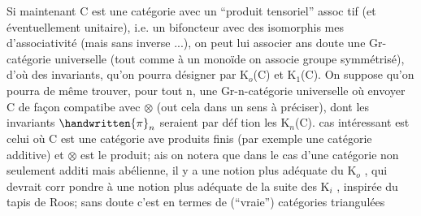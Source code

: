 Si maintenant C est une catégorie avec un ``produit tensoriel'' assoc
tif (et éventuellement unitaire), i.e. un bifoncteur avec des isomorphis%
mes d'associativité (mais sans inverse ...), on peut lui associer ans
doute une Gr-catégorie universelle (tout comme à un monoïde on associe
groupe symmétrisé), d'où des invariants, qu'on pourra désigner par K$_{o}$(C)
et K$_{1}$(C). On suppose qu'on pourra de même trouver, pour tout n, une
Gr-n-catégorie universelle où envoyer C de façon compatibe avec $\otimes$ (out
cela dans un sens à préciser), dont les invariants $\handwritten{\pi}_{n}$ seraient par déf
tion les K$_{n}$(C).  cas intéressant est celui où C est une catégorie ave
produits finis (par exemple une catégorie additive) et $\otimes$ est le produit;
\deleted{(}\handwritten{[}ais on notera que dans le cas d'une catégorie non seulement additi
mais abélienne, il y a une notion plus adéquate du K$_{o}$ , qui devrait corr
pondre à une notion plus adéquate de la suite des K$_{i}$ , inspirée du tapis
de Roos; sans doute c'est en termes de (``vraie'') catégories triangulées



